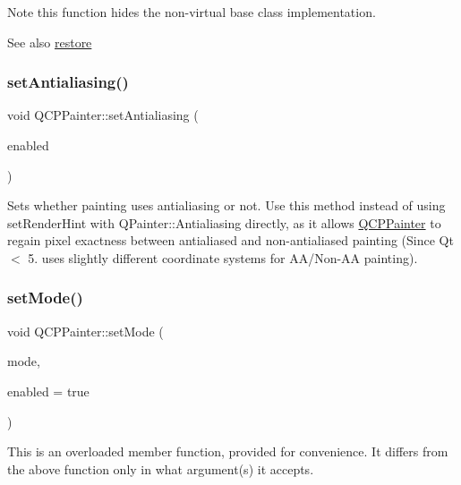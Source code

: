 \begin{DoxyNote}{Note}
this function hides the non-\/virtual base class implementation.
\end{DoxyNote}
\begin{DoxySeeAlso}{See also}
\mbox{\hyperlink{class_q_c_p_painter_a64908e6298d5bbd83457dc987cc3a022}{restore}} 
\end{DoxySeeAlso}
\mbox{\label{class_q_c_p_painter_aaba1deb9188244d9ea65b035112b4d05}} 
\subsubsection{\texorpdfstring{setAntialiasing()}{setAntialiasing()}}
{\footnotesize\ttfamily void Q\+C\+P\+Painter\+::set\+Antialiasing (\begin{DoxyParamCaption}\item[{bool}]{enabled }\end{DoxyParamCaption})}

Sets whether painting uses antialiasing or not. Use this method instead of using set\+Render\+Hint with Q\+Painter\+::\+Antialiasing directly, as it allows \mbox{\hyperlink{class_q_c_p_painter}{Q\+C\+P\+Painter}} to regain pixel exactness between antialiased and non-\/antialiased painting (Since Qt $<$ 5. uses slightly different coordinate systems for A\+A/\+Non-\/\+AA painting). \mbox{\label{class_q_c_p_painter_af6b1f7d2bbc548b10aa55d8b6ad49577}} 
\subsubsection{\texorpdfstring{setMode()}{setMode()}}
{\footnotesize\ttfamily void Q\+C\+P\+Painter\+::set\+Mode (\begin{DoxyParamCaption}\item[{\mbox{\hyperlink{class_q_c_p_painter_a156cf16444ff5e0d81a73c615fdb156d}{Q\+C\+P\+Painter\+::\+Painter\+Mode}}}]{mode,  }\item[{bool}]{enabled = {\ttfamily true} }\end{DoxyParamCaption})}

This is an overloaded member function, provided for convenience. It differs from the above function only in what argument(s) it accepts.

